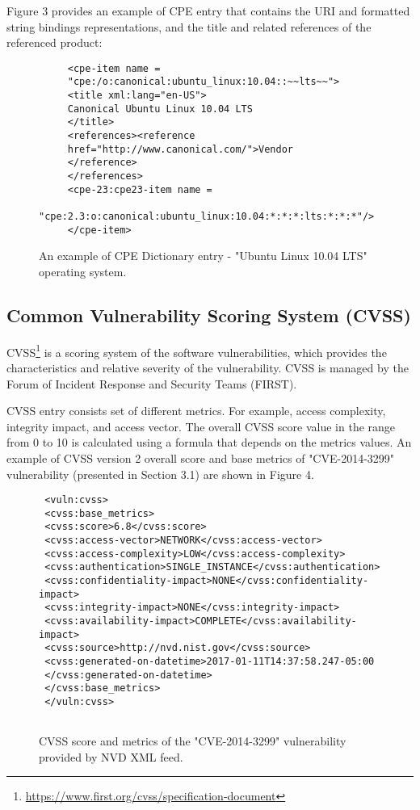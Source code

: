 \documentclass{llncs}
\begin{document}
  \par
  Figure 3 provides an example of CPE entry that contains the URI and formatted string bindings  representations, and the title and related references of the referenced product: 
  
  \begin{figure}
   
     \lstset{language=XML}
      \begin{lstlisting}
     <cpe-item name =
     "cpe:/o:canonical:ubuntu_linux:10.04::~~lts~~">
     <title xml:lang="en-US">
     Canonical Ubuntu Linux 10.04 LTS
     </title>
     <references><reference 
     href="http://www.canonical.com/">Vendor
     </reference>
     </references>
     <cpe-23:cpe23-item name =
    "cpe:2.3:o:canonical:ubuntu_linux:10.04:*:*:*:lts:*:*:*"/>
     </cpe-item>
      \end{lstlisting}
     \caption{An example of CPE Dictionary entry - "Ubuntu Linux 10.04 LTS" operating system.}
      \end{figure}
  
  
 \subsection{Common Vulnerability Scoring System (CVSS)}
 
 \par CVSS\footnote{\url{https://www.first.org/cvss/specification-document}} is a scoring system of the software  vulnerabilities, which provides the characteristics and relative severity of the vulnerability. CVSS is managed by the Forum of Incident Response and Security Teams (FIRST).
 
 \par CVSS entry consists set of different metrics. For example, access complexity, integrity impact, and access vector. The overall CVSS score value in the range from 0 to 10  is calculated using a formula that depends on the metrics values. An example of CVSS version 2 overall score and  base metrics of "CVE-2014-3299" vulnerability (presented in Section 3.1) are shown in Figure 4.
 
 \begin{figure}
    \centering
      \lstset{language=XML}
       \begin{lstlisting}
 <vuln:cvss>
 <cvss:base_metrics>
 <cvss:score>6.8</cvss:score>
 <cvss:access-vector>NETWORK</cvss:access-vector>
 <cvss:access-complexity>LOW</cvss:access-complexity>
 <cvss:authentication>SINGLE_INSTANCE</cvss:authentication>
 <cvss:confidentiality-impact>NONE</cvss:confidentiality-impact>
 <cvss:integrity-impact>NONE</cvss:integrity-impact>
 <cvss:availability-impact>COMPLETE</cvss:availability-impact>
 <cvss:source>http://nvd.nist.gov</cvss:source>
 <cvss:generated-on-datetime>2017-01-11T14:37:58.247-05:00
 </cvss:generated-on-datetime>
 </cvss:base_metrics>
 </vuln:cvss>
 
       \end{lstlisting}
      \caption{CVSS score and metrics of the "CVE-2014-3299" vulnerability provided by NVD XML feed.}
       \end{figure}
\end{document}
